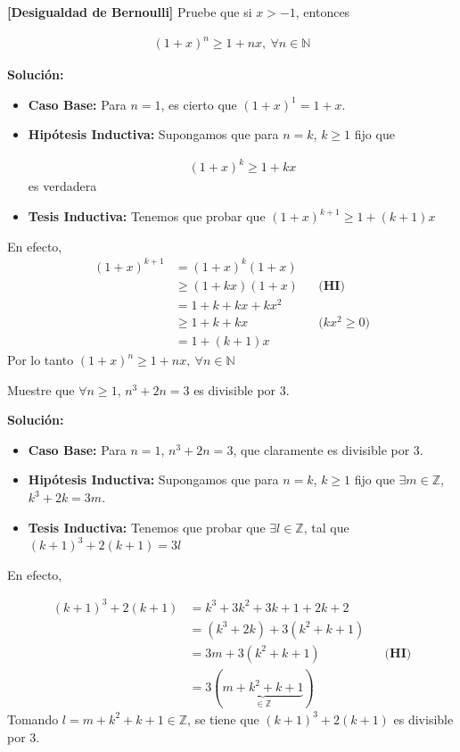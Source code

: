 \documentclass[12pt]{book}
\begin{document}
\begin{prob}{}{}
\textbf{[Desigualdad de Bernoulli]} Pruebe que si $x>-1$, entonces 

\begin{align*}
  (1+x)^n\geq 1+nx, \ \forall n \in \mathbb{N}  
\end{align*}
\end{prob}
\textbf{Solución:}
\begin{itemize}
    \item \textbf{Caso Base:} Para $n=1$, es cierto que $(1+x)^1=1+x$. 

    \item \textbf{Hipótesis Inductiva:} Supongamos que para $n=k$, $k\geq 1$ fijo que 

    \begin{align*}
        (1+x)^k \geq 1+kx
    \end{align*}
    es verdadera

    \item \textbf{Tesis Inductiva:} Tenemos que probar que $(1+x)^{k+1} \geq 1+(k+1)x$
\end{itemize}
En efecto,
\begin{align*}
    (1+x)^{k+1}&=(1+x)^k(1+x) \\
    &\geq(1+kx)(1+x) && \textbf{(HI)} \\
    &=1+k+kx+kx^2 \\
    &\geq 1+k+kx && \textbf{($kx^2 \geq 0$)} \\
    &=1+(k+1)x
\end{align*}
Por lo tanto $ (1+x)^n\geq 1+nx, \ \forall n \in \mathbb{N}$

\begin{prob}{}{}
    Muestre que $\forall n \geq 1$, $n^3+2n=3$ es divisible por 3.
\end{prob}
\textbf{Solución:}
\begin{itemize}
    \item \textbf{Caso Base:} Para $n=1$, $n^3 +2n =3$, que claramente es divisible por 3.

    \item \textbf{Hipótesis Inductiva:} Supongamos que para $n=k$, $k\geq 1$ fijo que $\exists m \in \mathbb{Z}$, $k^3 +2k =3m$.

    \item \textbf{Tesis Inductiva:} Tenemos que probar que $\exists l \in \mathbb{Z}$, tal que $(k+1)^3+2(k+1)=3l$
\end{itemize}
En efecto,

\begin{align*}
    (k+1)^3+2(k+1) &= k^3+3k^2+3k+1+2k+2 \\
    &=(k^3+2k)+3(k^2+k+1) \\
    &=3m + 3(k^2+k+1) && \textbf{(HI)}\\
    &=3(\underbrace{m+k^2+k+1}_{\in \mathbb{Z}})
\end{align*}
Tomando $l=m+k^2+k+1 \in \mathbb{Z}$, se tiene que $  (k+1)^3+2(k+1)$ es divisible por 3.
\end{document}
